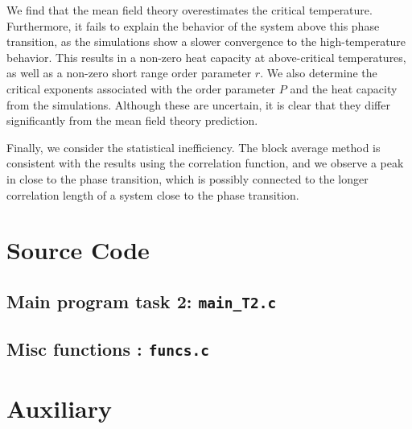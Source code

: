 We find that the mean field theory overestimates the critical
temperature. Furthermore, it fails to explain the behavior of the
system above this phase transition, as the simulations show a slower
convergence to the high-temperature behavior. This results in a
non-zero heat capacity at above-critical temperatures, as well as a
non-zero short range order parameter $r$. We also determine the
critical exponents associated with the order parameter $P$ and the
heat capacity from the simulations. Although these are uncertain, it
is clear that they differ significantly from the mean field theory
prediction. 

Finally, we consider the statistical inefficiency. The block average
method is consistent with the results using the correlation function,
and we observe a peak in close to the phase transition, which is
possibly connected to the longer correlation length of a system close
to the phase transition.  

\newpage

\appendix

\section{Source Code}

%

%

\subsection{Main program task 2: \texttt{main\_T2.c}}



\subsection{Misc functions : \texttt{funcs.c}}


\section{Auxiliary }
